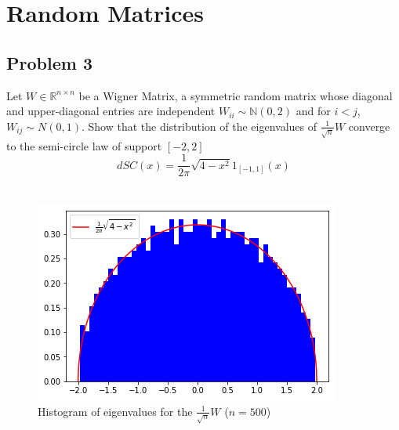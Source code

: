 \documentclass{amsart}
\begin{document}
	\section{Random Matrices}
	\subsection{Problem 3}
	Let $W \in \mathbb{R}^{n\times n}$ be a Wigner Matrix, a symmetric random matrix whose diagonal and upper-diagonal entries are independent $W_{ii} \sim \mathbb{N}(0,2)$ and for $i<j$, $W_{ij} \sim N(0,1)$. Show that the distribution of the eigenvalues of $\frac{1}{\sqrt{n}}W$ converge to the semi-circle law of support $[-2,2]$
	\[
	dSC(x) = \frac{1}{2\pi}\sqrt{4-x^2}1_{[-1,1]}(x)
	\]
	\\
	\begin{figure}[h!]
	\includegraphics[]{dSC.png}
	\caption{Histogram of eigenvalues for the $\frac{1}{\sqrt{n}}W$ ($n=500$)}
	\end{figure}
	\\
\end{document}
